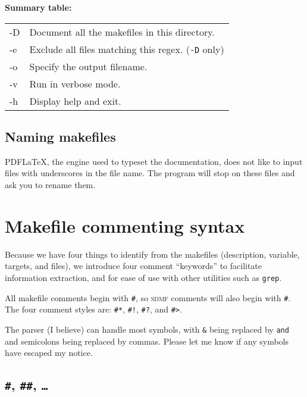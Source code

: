 \documentclass[oneside,11pt]{article}
\newcommand{\sdmf}{\textsc{sdmf}}
\begin{document}
	\begin{center}
	\end{center}
	
	\begin{minipage}{\textwidth}
		\textbf{Summary table:}	\\
		\begin{tabularx}{\textwidth}{>{\ttfamily}l X}
			-D & Document all the makefiles in this directory. \\
			-e & Exclude all files matching this regex. (\texttt{-D} only) \\
			-o & Specify the output filename. \\
			-v & Run in verbose mode. \\
			-h & Display help and exit.  \\
		\end{tabularx}
	\end{minipage}
		
	\subsection{Naming makefiles}
	
	PDF\LaTeX, the engine used to typeset the documentation, does not like to input files with underscores in the file name. The program will stop on these files and ask you to rename them. 

	
	\section{Makefile commenting syntax}
	
	Because we have four things to identify from the makefiles (description, variable, targets, and files), we introduce four comment ``keywords'' to facilitate information extraction, and for ease of use with other utilities such as \texttt{grep}.
	
	All makefile comments begin with \texttt{\#}, so \sdmf{} comments will also begin with \texttt{\#}. The four comment styles are: \texttt{\#*}, \texttt{\#!}, \texttt{\#?}, and \texttt{\#>}.
	
	The parser (I believe) can handle most symbols, with \texttt{\&} being replaced by \texttt{and} and semicolons being replaced by commas. Please let me know if any symbols have escaped my notice.
	
	\subsection{\texttt{\#}, \texttt{\#\#}, \texttt{\ldots}}
	
\end{document}

